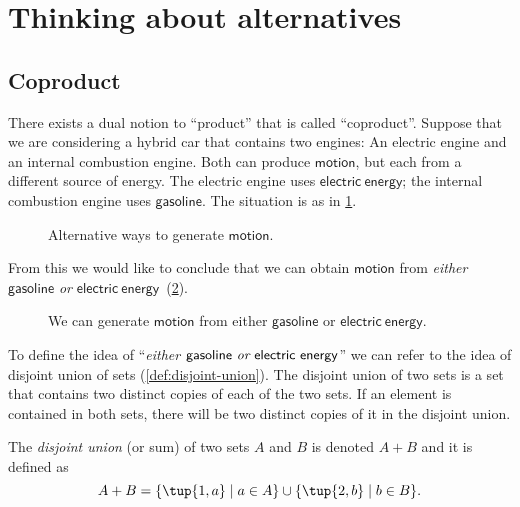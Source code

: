 \section{Thinking about alternatives}
\label{sec:coproductset}
\subsection{Coproduct}

There exists a dual notion to ``product'' that is called ``coproduct''. Suppose that we are considering a hybrid car that contains two engines: An
electric engine and an internal combustion engine. Both can produce $\mathsf{motion}$, but each from a different source of energy. The electric engine uses $\mathsf{electric}\ \mathsf{energy}$; the internal combustion engine uses $\mathsf{gasoline}$. The situation is as in \cref{fig:e16a}.

\begin{figure}[h!]
    \centering
    \caption{Alternative ways to generate $\mathsf{motion}$. \label{fig:e16a}}
\end{figure}

From this we would like to conclude that we can obtain $\mathsf{motion}$ from \emph{either} $\mathsf{gasoline}$ \emph{or}
$\mathsf{electric}\ \mathsf{energy}$~(\cref{fig:e16b}).

\begin{figure}[h!]
    \centering
    \caption{We can generate $\mathsf{motion}$ from either $\mathsf{gasoline}$ or $\mathsf{electric} \ \mathsf{energy}$. \label{fig:e16b}}
\end{figure}

To define the idea of ``\emph{either $\mathsf{gasoline}\ \emph{or} \ \mathsf{electric}\ \mathsf{energy}$}'' we can
refer to the idea of disjoint union of sets (\cref{def:disjoint-union}). The
disjoint union of two sets is a set that contains two distinct copies of each of the two sets. If an element is contained in both sets, there will be two distinct copies of it in the disjoint union.

\begin{definition}
\label{def:disjoint-union}
    The \emph{disjoint union} (or sum) of two sets $A$ and $B$ is denoted $A + B$
    and it is defined as
    \begin{equation}
        A + B=\{\tup{1,a}\mid a\in A\}\cup\{\tup{2,b}\mid b\in B\}.
    \end{equation}
\end{definition}

